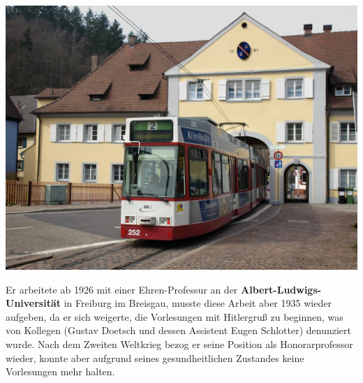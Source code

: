 \documentclass[landscape, a4paper]{article}
\newcommand\alert[1]{\textcolor{PrimaryColor}{\textbf{#1}}}
\begin{document}
\begin{minipage}[t]{0.33\textwidth}
	\includegraphics[width=\linewidth]{./figures/tor.png}
	\setlength{\parskip}{0.25cm}
	\vspace{0.15cm}

	Er arbeitete ab 1926 mit einer Ehren-Professur an der \alert{Albert-Ludwigs-Universität} in Freiburg im Breisgau, musste diese Arbeit aber 1935 wieder aufgeben, da er sich weigerte, die Vorlesungen mit Hitlergruß zu beginnen, was von Kollegen (Gustav Doetsch und dessen Assistent Eugen Schlotter) denunziert wurde. Nach dem Zweiten Weltkrieg bezog er seine Position als Honorarprofessor wieder, konnte aber aufgrund seines gesundheitlichen Zustandes keine Vorlesungen mehr halten.
\end{minipage}
\newpage
\end{document}
